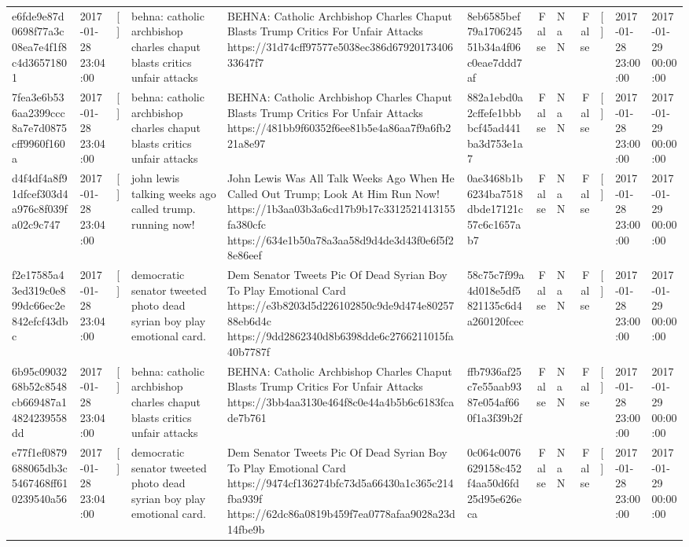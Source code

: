 \begin{tabular}{llllllrlrlll}
e6fde9e87d0698f77a3c08ea7e4f1f8c4d36571801 & 2017-01-28 23:04:00 & [] & behna: catholic archbishop charles chaput blasts critics unfair attacks & BEHNA: Catholic Archbishop Charles Chaput Blasts Trump Critics For Unfair Attacks https://31d74cff97577e5038ec386d6792017340633647f7 & 8eb6585bef79a170624551b34a4f06c0eae7ddd7af & False & NaN & False & [] & 2017-01-28 23:00:00 & 2017-01-29 00:00:00 \\
7fea3e6b536aa2399ccc8a7e7d0875cff9960f160a & 2017-01-28 23:04:00 & [] & behna: catholic archbishop charles chaput blasts critics unfair attacks & BEHNA: Catholic Archbishop Charles Chaput Blasts Trump Critics For Unfair Attacks https://481bb9f60352f6ee81b5e4a86aa7f9a6fb221a8e97 & 882a1ebd0a2cffefe1bbbbcf45ad441ba3d753e1a7 & False & NaN & False & [] & 2017-01-28 23:00:00 & 2017-01-29 00:00:00 \\
d4f4df4a8f91dfcef303d4a976c8f039fa02c9c747 & 2017-01-28 23:04:00 & [] & john lewis talking weeks ago called trump. running now! & John Lewis Was All Talk Weeks Ago When He Called Out Trump; Look At Him Run Now! https://1b3aa03b3a6cd17b9b17c3312521413155fa380cfc https://634e1b50a78a3aa58d9d4de3d43f0e6f5f28e86eef & 0ae3468b1b6234ba7518dbde17121c57c6c1657ab7 & False & NaN & False & [] & 2017-01-28 23:00:00 & 2017-01-29 00:00:00 \\
f2e17585a43ed319c0e899dc66ec2e842efcf43dbc & 2017-01-28 23:04:00 & [] & democratic senator tweeted photo dead syrian boy play emotional card. & Dem Senator Tweets Pic Of Dead Syrian Boy To Play Emotional Card https://e3b8203d5d226102850c9de9d474e8025788eb6d4c https://9dd2862340d8b6398dde6c2766211015fa40b7787f & 58c75c7f99a4d018e5df5821135c6d4a260120fcec & False & NaN & False & [] & 2017-01-28 23:00:00 & 2017-01-29 00:00:00 \\
6b95c0903268b52c8548cb669487a14824239558dd & 2017-01-28 23:04:00 & [] & behna: catholic archbishop charles chaput blasts critics unfair attacks & BEHNA: Catholic Archbishop Charles Chaput Blasts Trump Critics For Unfair Attacks https://3bb4aa3130e464f8c0e44a4b5b6c6183fcade7b761 & ffb7936af25c7e55aab9387e054af660f1a3f39b2f & False & NaN & False & [] & 2017-01-28 23:00:00 & 2017-01-29 00:00:00 \\
e77f1ef0879688065db3c5467468ff610239540a56 & 2017-01-28 23:04:00 & [] & democratic senator tweeted photo dead syrian boy play emotional card. & Dem Senator Tweets Pic Of Dead Syrian Boy To Play Emotional Card https://9474cf136274bfc73d5a66430a1c365c214fba939f https://62dc86a0819b459f7ea0778afaa9028a23d14fbe9b & 0c064c0076629158c452f4aa50d6fd25d95e626eca & False & NaN & False & [] & 2017-01-28 23:00:00 & 2017-01-29 00:00:00 \\

\end{tabular}

